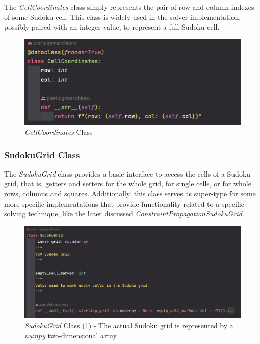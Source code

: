 The \textit{CellCoordinates} class simply represents the pair of row and column indexes of some Sudoku cell. This class is widely used in the solver implementation, possibly paired with an integer value, to represent a full Sudoku cell.

\begin{figure}[h]
    \centering
    \includegraphics[scale=0.65]{assignment-1/images/cp/data-1-cell-coords.png}
    \caption{\textit{CellCoordinates} Class}
    \label{fig:data_1}
\end{figure}

\subsubsection{SudokuGrid Class}

The \textit{SudokuGrid} class provides a basic interface to access the cells of a Sudoku grid, that is, getters and setters for the whole grid, for single cells, or for whole rows, columns and squares.
Additionally, this class serves as super-type for some more specific implementations that provide functionality related to a specific solving technique, like the later discussed \textit{ConstraintPropagationSudokuGrid}.

\begin{figure}[h]
    \centering
    \includegraphics[scale=0.65]{assignment-1/images/cp/data-2_1-grid.png}
    \caption{\textit{SudokuGrid} Class (1) - The actual Sudoku grid is represented by a \textit{numpy} two-dimensional array}
    \label{fig:data_2_1}
\end{figure}

